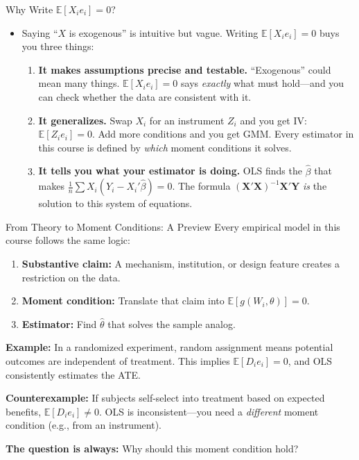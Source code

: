 \documentclass[aspectratio=169]{beamer}
\numberwithin{equation}{section}
\begin{document}
\begin{frame}{Why Write $\mathbb{E}[X_i e_i]=0$?}
\begin{itemize}
\item Saying ``$X$ is exogenous'' is intuitive but vague.  Writing $\mathbb{E}[X_i e_i]=0$ buys you three things:\pause
\begin{enumerate}
\item \textbf{It makes assumptions precise and testable.}  ``Exogenous'' could mean many things.  $\mathbb{E}[X_i e_i]=0$ says \emph{exactly} what must hold---and you can check whether the data are consistent with it.\pause
\item \textbf{It generalizes.}  Swap $X_i$ for an instrument $Z_i$ and you get IV: $\mathbb{E}[Z_i e_i]=0$.  Add more conditions and you get GMM.  Every estimator in this course is defined by \emph{which} moment conditions it solves.\pause
\item \textbf{It tells you what your estimator is doing.}  OLS finds the $\hat{\beta}$ that makes $\frac{1}{n}\sum X_i(Y_i - X_i'\hat{\beta})=0$.  The formula $(\bm{X}'\bm{X})^{-1}\bm{X}'\bm{Y}$ \emph{is} the solution to this system of equations.
\end{enumerate}
\end{itemize}
\end{frame}


\begin{frame}{From Theory to Moment Conditions: A Preview}
Every empirical model in this course follows the same logic:
\vspace{-2pt}
\begin{tcolorbox}[colback=blue!5, colframe=blue!50]
\begin{enumerate}
\item \textbf{Substantive claim:}  A mechanism, institution, or design feature creates a restriction on the data.
\item \textbf{Moment condition:}  Translate that claim into $\mathbb{E}[g(W_i, \theta)]=0$.
\item \textbf{Estimator:}  Find $\hat{\theta}$ that solves the sample analog.
\end{enumerate}
\end{tcolorbox}

\smallskip\pause
\textbf{Example:} In a randomized experiment, random assignment means potential outcomes are independent of treatment.  This implies $\mathbb{E}[D_i e_i]=0$, and OLS consistently estimates the ATE.

\smallskip\pause
\textbf{Counterexample:} If subjects self-select into treatment based on expected benefits, $\mathbb{E}[D_i e_i]\neq 0$.  OLS is inconsistent---you need a \emph{different} moment condition (e.g., from an instrument).

\smallskip
\textbf{The question is always:} \alert{Why should this moment condition hold?}
\end{frame}
\end{document}
